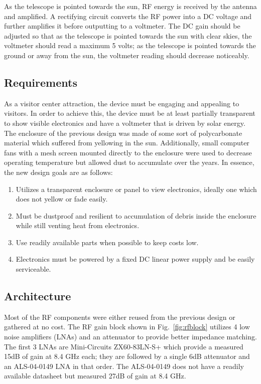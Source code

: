 \documentclass[titlepage]{article}
\begin{document}
As the telescope is pointed towards the sun, RF energy is received by the antenna and amplified. A rectifying circuit converts the RF power into a DC voltage and further amplifies it before outputting to a voltmeter. The DC gain should be adjusted so that as the telescope is pointed towards the sun with clear skies, the voltmeter should read a maximum 5 volts; as the telescope is pointed towards the ground or away from the sun, the voltmeter reading should decrease noticeably.

\subsection{Requirements}
As a visitor center attraction, the device must be engaging and appealing to visitors. In order to achieve this, the device must be at least partially transparent to show visible electronics and have a voltmeter that is driven by solar energy. The enclosure of the previous design was made of some sort of polycarbonate material which suffered from yellowing in the sun. Additionally, small computer fans with a mesh screen mounted directly to the enclosure were used to decrease operating temperature but allowed dust to accumulate over the years. In essence, the new design goals are as follows:
\begin{enumerate}
    \item Utilizes a transparent enclosure or panel to view electronics, ideally one which does not yellow or fade easily.
    \item Must be dustproof and resilient to accumulation of debris inside the enclosure while still venting heat from electronics.
    \item Use readily available parts when possible to keep costs low.
    \item Electronics must be powered by a fixed DC linear power supply and be easily serviceable.
\end{enumerate}

\subsection{Architecture}
Most of the RF components were either reused from the previous design or gathered at no cost. The RF gain block shown in Fig.~\ref{fig:rfblock} utilizes 4 low noise amplifiers (LNAs) and an attenuator to provide better impedance matching. The first 3 LNAs are Mini-Circuits ZX60-83LN-S+ which provide a measured 15dB of gain at 8.4 GHz each; they are followed by a single 6dB attenuator and an ALS-04-0149 LNA in that order. The ALS-04-0149 does not have a readily available datasheet but measured 27dB of gain at 8.4 GHz.
\end{document}
